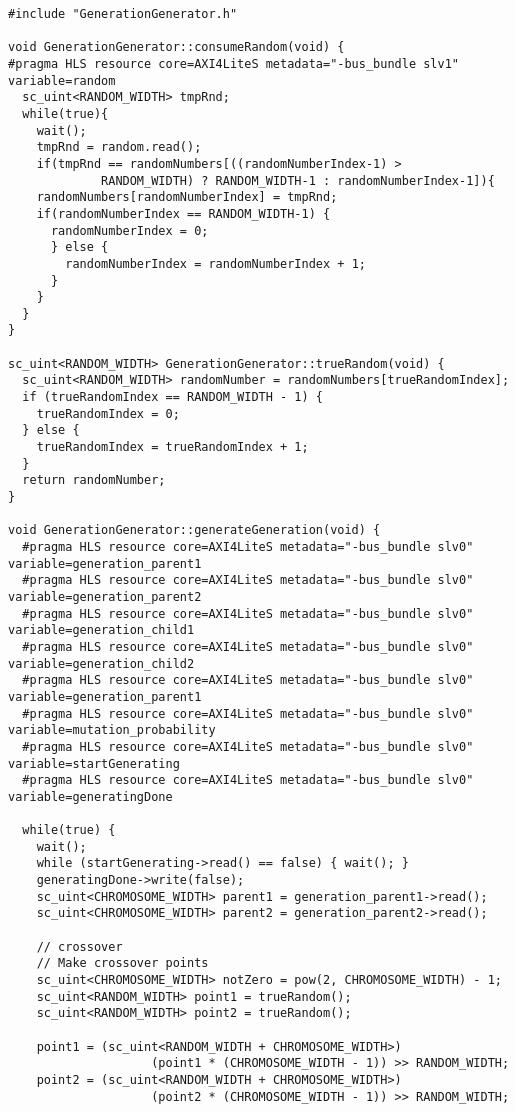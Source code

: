 \begin{lstlisting}[style=customc++,caption={GenerationGenerator.cpp},label={lst:generationgenerator_cpp}]
#include "GenerationGenerator.h"

void GenerationGenerator::consumeRandom(void) {
#pragma HLS resource core=AXI4LiteS metadata="-bus_bundle slv1" variable=random
  sc_uint<RANDOM_WIDTH> tmpRnd;
  while(true){
    wait();
    tmpRnd = random.read();
    if(tmpRnd == randomNumbers[((randomNumberIndex-1) > 
             RANDOM_WIDTH) ? RANDOM_WIDTH-1 : randomNumberIndex-1]){
    randomNumbers[randomNumberIndex] = tmpRnd;
    if(randomNumberIndex == RANDOM_WIDTH-1) {
      randomNumberIndex = 0;
      } else {
        randomNumberIndex = randomNumberIndex + 1;
      }
    }
  }
}

sc_uint<RANDOM_WIDTH> GenerationGenerator::trueRandom(void) {
  sc_uint<RANDOM_WIDTH> randomNumber = randomNumbers[trueRandomIndex];
  if (trueRandomIndex == RANDOM_WIDTH - 1) {
    trueRandomIndex = 0;
  } else {
    trueRandomIndex = trueRandomIndex + 1;
  }
  return randomNumber;
}

void GenerationGenerator::generateGeneration(void) {
  #pragma HLS resource core=AXI4LiteS metadata="-bus_bundle slv0" variable=generation_parent1
  #pragma HLS resource core=AXI4LiteS metadata="-bus_bundle slv0" variable=generation_parent2
  #pragma HLS resource core=AXI4LiteS metadata="-bus_bundle slv0" variable=generation_child1
  #pragma HLS resource core=AXI4LiteS metadata="-bus_bundle slv0" variable=generation_child2
  #pragma HLS resource core=AXI4LiteS metadata="-bus_bundle slv0" variable=generation_parent1
  #pragma HLS resource core=AXI4LiteS metadata="-bus_bundle slv0" variable=mutation_probability
  #pragma HLS resource core=AXI4LiteS metadata="-bus_bundle slv0" variable=startGenerating
  #pragma HLS resource core=AXI4LiteS metadata="-bus_bundle slv0" variable=generatingDone

  while(true) {
    wait();	
    while (startGenerating->read() == false) { wait(); }
    generatingDone->write(false);
    sc_uint<CHROMOSOME_WIDTH> parent1 = generation_parent1->read();
    sc_uint<CHROMOSOME_WIDTH> parent2 = generation_parent2->read();

    // crossover
    // Make crossover points
    sc_uint<CHROMOSOME_WIDTH> notZero = pow(2, CHROMOSOME_WIDTH) - 1;
    sc_uint<RANDOM_WIDTH> point1 = trueRandom();
    sc_uint<RANDOM_WIDTH> point2 = trueRandom();

    point1 = (sc_uint<RANDOM_WIDTH + CHROMOSOME_WIDTH>) 
                    (point1 * (CHROMOSOME_WIDTH - 1)) >> RANDOM_WIDTH;
    point2 = (sc_uint<RANDOM_WIDTH + CHROMOSOME_WIDTH>) 
                    (point2 * (CHROMOSOME_WIDTH - 1)) >> RANDOM_WIDTH;


\end{lstlisting}
